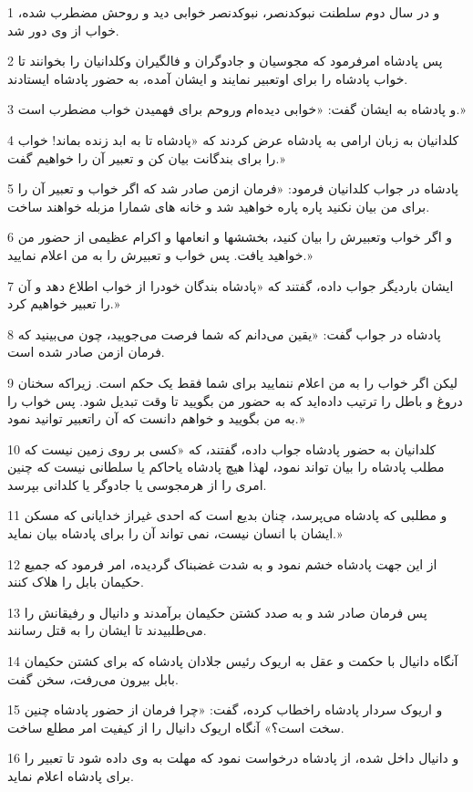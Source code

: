 \par 1 و در سال دوم سلطنت نبوکدنصر، نبوکدنصر خوابی دید و روحش مضطرب شده، خواب از وی دور شد.
\par 2 پس پادشاه امرفرمود که مجوسیان و جادوگران و فالگیران وکلدانیان را بخوانند تا خواب پادشاه را برای اوتعبیر نمایند و ایشان آمده، به حضور پادشاه ایستادند.
\par 3 و پادشاه به ایشان گفت: «خوابی دیده‌ام وروحم برای فهمیدن خواب مضطرب است.»
\par 4 کلدانیان به زبان ارامی به پادشاه عرض کردند که «پادشاه تا به ابد زنده بماند! خواب را برای بندگانت بیان کن و تعبیر آن را خواهیم گفت.»
\par 5 پادشاه در جواب کلدانیان فرمود: «فرمان ازمن صادر شد که اگر خواب و تعبیر آن را برای من بیان نکنید پاره پاره خواهید شد و خانه های شمارا مزبله خواهند ساخت.
\par 6 و اگر خواب وتعبیرش را بیان کنید، بخششها و انعامها و اکرام عظیمی از حضور من خواهید یافت. پس خواب و تعبیرش را به من اعلام نمایید.»
\par 7 ایشان باردیگر جواب داده، گفتند که «پادشاه بندگان خودرا از خواب اطلاع دهد و آن را تعبیر خواهیم کرد.»
\par 8 پادشاه در جواب گفت: «یقین می‌دانم که شما فرصت می‌جویید، چون می‌بینید که فرمان ازمن صادر شده است.
\par 9 لیکن اگر خواب را به من اعلام ننمایید برای شما فقط یک حکم است. زیراکه سخنان دروغ و باطل را ترتیب داده‌اید که به حضور من بگویید تا وقت تبدیل شود. پس خواب را به من بگویید و خواهم دانست که آن راتعبیر توانید نمود.»
\par 10 کلدانیان به حضور پادشاه جواب داده، گفتند، که «کسی بر روی زمین نیست که مطلب پادشاه را بیان تواند نمود، لهذا هیچ پادشاه یاحاکم یا سلطانی نیست که چنین امری را از هرمجوسی یا جادوگر یا کلدانی بپرسد.
\par 11 و مطلبی که پادشاه می‌پرسد، چنان بدیع است که احدی غیراز خدایانی که مسکن ایشان با انسان نیست، نمی تواند آن را برای پادشاه بیان نماید.»
\par 12 از این جهت پادشاه خشم نمود و به شدت غضبناک گردیده، امر فرمود که جمیع حکیمان بابل را هلاک کنند.
\par 13 پس فرمان صادر شد و به صدد کشتن حکیمان برآمدند و دانیال و رفیقانش را می‌طلبیدند تا ایشان را به قتل رسانند.
\par 14 آنگاه دانیال با حکمت و عقل به اریوک رئیس جلادان پادشاه که برای کشتن حکیمان بابل بیرون می‌رفت، سخن گفت.
\par 15 و اریوک سردار پادشاه راخطاب کرده، گفت: «چرا فرمان از حضور پادشاه چنین سخت است؟» آنگاه اریوک دانیال را از کیفیت امر مطلع ساخت.
\par 16 و دانیال داخل شده، از پادشاه درخواست نمود که مهلت به وی داده شود تا تعبیر را برای پادشاه اعلام نماید.
